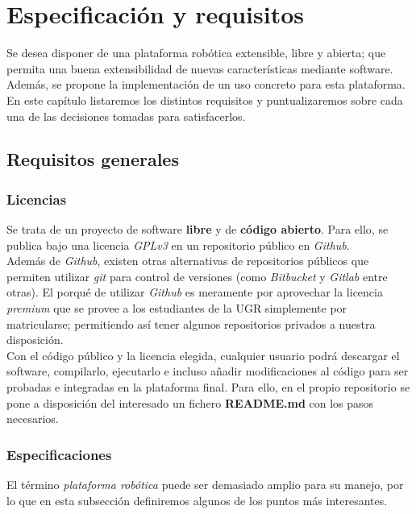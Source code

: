 \chapter{Especificación y requisitos}

Se desea disponer de una plataforma robótica extensible, libre y abierta; que permita una buena extensibilidad de nuevas características mediante software. Además, se propone la implementación de un uso concreto para esta plataforma. En este capítulo listaremos los distintos requisitos y puntualizaremos sobre cada una de las decisiones tomadas para satisfacerlos.

\section{Requisitos generales}

\subsection{Licencias}

Se trata de un proyecto de software \textbf{libre} y de \textbf{código abierto}. Para ello, se publica bajo una licencia \textit{GPLv3} en un repositorio público en \textit{Github}.\\

Además de \textit{Github}, existen otras alternativas de repositorios públicos que permiten utilizar \textit{git} para control de versiones (como \textit{Bitbucket} y \textit{Gitlab} entre otras). El porqué de utilizar \textit{Github} es meramente por aprovechar la licencia \textit{premium} que se provee a los estudiantes de la UGR simplemente por matricularse; permitiendo así tener algunos repositorios privados a nuestra disposición.\\

Con el código público y la licencia elegida, cualquier usuario podrá descargar el software, compilarlo, ejecutarlo e incluso añadir modificaciones al código para ser probadas e integradas en la plataforma final. Para ello, en el propio repositorio se pone a disposición del interesado un fichero \textbf{README.md} con los pasos necesarios.


\subsection{Especificaciones}

El término \textit{plataforma robótica} puede ser demasiado amplio para su manejo, por lo que en esta subsección definiremos algunos de los puntos más interesantes.

